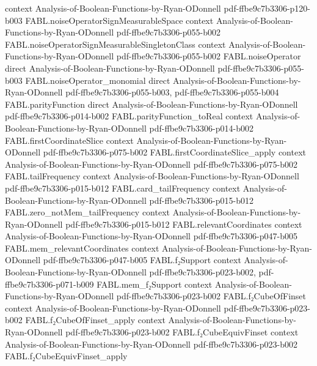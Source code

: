 \begin{theorem}
  {context}
  {Analysis-of-Boolean-Functions-by-Ryan-ODonnell}
  {pdf-ffbe9c7b3306-p120-b003}
\proofstep
  {FABL.noiseOperatorSignMeasurableSpace}
  {context}
  {Analysis-of-Boolean-Functions-by-Ryan-ODonnell}
  {pdf-ffbe9c7b3306-p055-b002}
\proofstep
  {FABL.noiseOperatorSignMeasurableSingletonClass}
  {context}
  {Analysis-of-Boolean-Functions-by-Ryan-ODonnell}
  {pdf-ffbe9c7b3306-p055-b002}
\proofstep
  {FABL.noiseOperator}
  {direct}
  {Analysis-of-Boolean-Functions-by-Ryan-ODonnell}
  {pdf-ffbe9c7b3306-p055-b003}
\proofstep
  {FABL.noiseOperator_monomial}
  {direct}
  {Analysis-of-Boolean-Functions-by-Ryan-ODonnell}
  {pdf-ffbe9c7b3306-p055-b003,
    pdf-ffbe9c7b3306-p055-b004}
\proofstep
  {FABL.parityFunction}
  {direct}
  {Analysis-of-Boolean-Functions-by-Ryan-ODonnell}
  {pdf-ffbe9c7b3306-p014-b002}
\proofstep
  {FABL.parityFunction_toReal}
  {context}
  {Analysis-of-Boolean-Functions-by-Ryan-ODonnell}
  {pdf-ffbe9c7b3306-p014-b002}
\proofstep
  {FABL.firstCoordinateSlice}
  {context}
  {Analysis-of-Boolean-Functions-by-Ryan-ODonnell}
  {pdf-ffbe9c7b3306-p075-b002}
\proofstep
  {FABL.firstCoordinateSlice_apply}
  {context}
  {Analysis-of-Boolean-Functions-by-Ryan-ODonnell}
  {pdf-ffbe9c7b3306-p075-b002}
\proofstep
  {FABL.tailFrequency}
  {context}
  {Analysis-of-Boolean-Functions-by-Ryan-ODonnell}
  {pdf-ffbe9c7b3306-p015-b012}
\proofstep
  {FABL.card_tailFrequency}
  {context}
  {Analysis-of-Boolean-Functions-by-Ryan-ODonnell}
  {pdf-ffbe9c7b3306-p015-b012}
\proofstep
  {FABL.zero_notMem_tailFrequency}
  {context}
  {Analysis-of-Boolean-Functions-by-Ryan-ODonnell}
  {pdf-ffbe9c7b3306-p015-b012}
\proofstep
  {FABL.relevantCoordinates}
  {context}
  {Analysis-of-Boolean-Functions-by-Ryan-ODonnell}
  {pdf-ffbe9c7b3306-p047-b005}
\proofstep
  {FABL.mem_relevantCoordinates}
  {context}
  {Analysis-of-Boolean-Functions-by-Ryan-ODonnell}
  {pdf-ffbe9c7b3306-p047-b005}
\proofstep
  {FABL.f₂Support}
  {context}
  {Analysis-of-Boolean-Functions-by-Ryan-ODonnell}
  {pdf-ffbe9c7b3306-p023-b002,
    pdf-ffbe9c7b3306-p071-b009}
\proofstep
  {FABL.mem_f₂Support}
  {context}
  {Analysis-of-Boolean-Functions-by-Ryan-ODonnell}
  {pdf-ffbe9c7b3306-p023-b002}
\proofstep
  {FABL.f₂CubeOfFinset}
  {context}
  {Analysis-of-Boolean-Functions-by-Ryan-ODonnell}
  {pdf-ffbe9c7b3306-p023-b002}
\proofstep
  {FABL.f₂CubeOfFinset_apply}
  {context}
  {Analysis-of-Boolean-Functions-by-Ryan-ODonnell}
  {pdf-ffbe9c7b3306-p023-b002}
\proofstep
  {FABL.f₂CubeEquivFinset}
  {context}
  {Analysis-of-Boolean-Functions-by-Ryan-ODonnell}
  {pdf-ffbe9c7b3306-p023-b002}
\proofstep
  {FABL.f₂CubeEquivFinset_apply}

\end{theorem}
